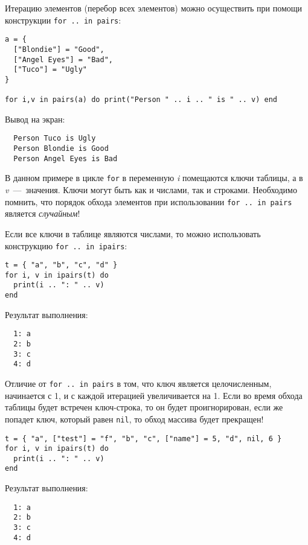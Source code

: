 Итерацию элементов (перебор всех элементов) можно осуществить при помощи конструкции \lstinline{for .. in pairs}:

\begin{lstlisting}
a = {
  ["Blondie"] = "Good",
  ["Angel Eyes"] = "Bad",
  ["Tuco"] = "Ugly"
}

for i,v in pairs(a) do print("Person " .. i .. " is " .. v) end
\end{lstlisting}

Вывод на экран:

\begin{lstlisting}
  Person Tuco is Ugly
  Person Blondie is Good
  Person Angel Eyes is Bad
\end{lstlisting}


В данном примере в цикле \lstinline{for} в переменную \emph{i} помещаются ключи таблицы, а в \emph{v}~---~значения. 
Ключи могут быть как и числами, так и строками. Необходимо помнить, что порядок обхода элементов при использовании \lstinline{for .. in pairs} является \emph{случайным}!

Если все ключи в таблице являются числами, то можно использовать конструкцию \lstinline{for .. in ipairs}:

\begin{lstlisting}
t = { "a", "b", "c", "d" }  
for i, v in ipairs(t) do  
  print(i .. ": " .. v)   
end  
\end{lstlisting}

Результат выполнения:

\begin{lstlisting}
  1: a
  2: b
  3: c
  4: d
\end{lstlisting}

Отличие от \lstinline{for .. in pairs} в том, что ключ является целочисленным, начинается с 1, и с каждой итерацией увеличивается на 1. Если во время обхода таблицы будет встречен ключ-строка, то он будет проигнорирован, если же попадет ключ, который равен \lstinline{nil}, то обход массива будет прекращен!

\begin{lstlisting}
t = { "a", ["test"] = "f", "b", "c", ["name"] = 5, "d", nil, 6 }  
for i, v in ipairs(t) do  
  print(i .. ": " .. v)   
end  
\end{lstlisting}

Результат выполнения:

\begin{lstlisting}
  1: a
  2: b
  3: c
  4: d
\end{lstlisting}

